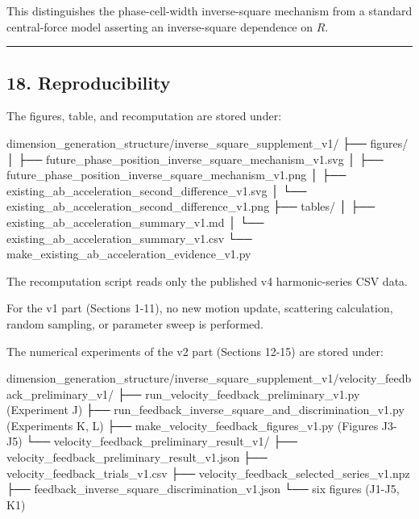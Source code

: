 \documentclass[
  a4paper,
]{article}
\newenvironment{Shaded}{}{}
\newcommand{\NormalTok}[1]{#1}
\begin{document}
This distinguishes the phase-cell-width inverse-square mechanism from a
standard central-force model asserting an inverse-square dependence on
\(R\).

\begin{center}\rule{0.5\linewidth}{0.5pt}\end{center}

\subsection{18. Reproducibility}\label{reproducibility}

The figures, table, and recomputation are stored under:

\begin{Shaded}
\begin{Highlighting}[]
\NormalTok{dimension\_generation\_structure/inverse\_square\_supplement\_v1/}
\NormalTok{├── figures/}
\NormalTok{│   ├── future\_phase\_position\_inverse\_square\_mechanism\_v1.svg}
\NormalTok{│   ├── future\_phase\_position\_inverse\_square\_mechanism\_v1.png}
\NormalTok{│   ├── existing\_ab\_acceleration\_second\_difference\_v1.svg}
\NormalTok{│   └── existing\_ab\_acceleration\_second\_difference\_v1.png}
\NormalTok{├── tables/}
\NormalTok{│   ├── existing\_ab\_acceleration\_summary\_v1.md}
\NormalTok{│   └── existing\_ab\_acceleration\_summary\_v1.csv}
\NormalTok{└── make\_existing\_ab\_acceleration\_evidence\_v1.py}
\end{Highlighting}
\end{Shaded}

The recomputation script reads only the published v4 harmonic-series CSV
data.

For the v1 part (Sections 1-11), no new motion update, scattering
calculation, random sampling, or parameter sweep is performed.

The numerical experiments of the v2 part (Sections 12-15) are stored
under:

\begin{Shaded}
\begin{Highlighting}[]
\NormalTok{dimension\_generation\_structure/inverse\_square\_supplement\_v1/velocity\_feedback\_preliminary\_v1/}
\NormalTok{├── run\_velocity\_feedback\_preliminary\_v1.py          (Experiment J)}
\NormalTok{├── run\_feedback\_inverse\_square\_and\_discrimination\_v1.py (Experiments K, L)}
\NormalTok{├── make\_velocity\_feedback\_figures\_v1.py             (Figures J3{-}J5)}
\NormalTok{└── velocity\_feedback\_preliminary\_result\_v1/}
\NormalTok{    ├── velocity\_feedback\_preliminary\_result\_v1.json}
\NormalTok{    ├── velocity\_feedback\_trials\_v1.csv}
\NormalTok{    ├── velocity\_feedback\_selected\_series\_v1.npz}
\NormalTok{    ├── feedback\_inverse\_square\_discrimination\_v1.json}
\NormalTok{    └── six figures (J1{-}J5, K1)}
\end{Highlighting}
\end{Shaded}
\end{document}
